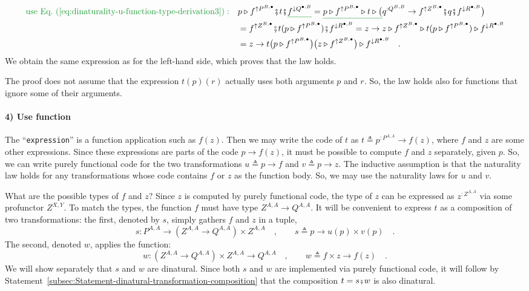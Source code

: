 \begin{align*}
{\color{greenunder}\text{use Eq.~(\ref{eq:dinaturality-u-function-type-derivation3})}:}\quad & p\triangleright f^{\uparrow P^{B,\bullet}}\bef t\bef\gunderline{f^{\downarrow Q^{\bullet,B}}}=\gunderline{p\triangleright f^{\uparrow P^{B,\bullet}}\triangleright t\triangleright\big(}q^{:Q^{B,B}}\rightarrow f^{\uparrow Z^{B,\bullet}}\bef q\bef f^{\downarrow R^{\bullet,B}}\big)\\
 & =f^{\uparrow Z^{B,\bullet}}\bef t(p\triangleright f^{\uparrow P^{B,\bullet}})\bef f^{\downarrow R^{\bullet,B}}=z\rightarrow z\triangleright f^{\uparrow Z^{B,\bullet}}\triangleright t(p\triangleright f^{\uparrow P^{B,\bullet}})\triangleright f^{\downarrow R^{\bullet,B}}\\
 & =z\rightarrow t\big(p\triangleright f^{\uparrow P^{B,\bullet}}\big)\big(z\triangleright f^{\uparrow Z^{B,\bullet}}\big)\triangleright f^{\downarrow R^{\bullet,B}}\quad.
\end{align*}
We obtain the same expression as for the left-hand side, which proves
that the law holds.

The proof does not assume that the expression $t(p)(r)$ actually
uses both arguments $p$ and $r$. So, the law holds also for functions
that ignore some of their arguments.

\paragraph{4) Use function }

The \textsf{``}\lstinline!expression!\textsf{''} is a function application such as
$f(z)$. Then we may write the code of $t$ as $t\triangleq p^{:P^{A,A}}\rightarrow f(z)$,
where $f$ and $z$ are some other expressions. Since these expressions
are parts of the code $p\rightarrow f(z)$, it must be possible to
compute $f$ and $z$ separately, given $p$. So, we can write purely
functional code for the two transformations $u\triangleq p\rightarrow f$
and $v\triangleq p\rightarrow z$. The inductive assumption is that
the naturality law holds for any transformations whose code contains
$f$ or $z$ as the function body. So, we may use the naturality laws
for $u$ and $v$.

What are the possible types of $f$ and $z$? Since $z$ is computed
by purely functional code, the type of $z$ can be expressed as $z^{:Z^{A,A}}$
via some profunctor $Z^{X,Y}$. To match the types, the function $f$
must have type $Z^{A,A}\rightarrow Q^{A,A}$. It will be convenient
to express $t$ as a composition of two transformations: the first,
denoted by $s$, simply gathers $f$ and $z$ in a tuple,
\[
s:P^{A,A}\rightarrow(Z^{A,A}\rightarrow Q^{A,A})\times Z^{A,A}\quad,\quad\quad s\triangleq p\rightarrow u(p)\times v(p)\quad.
\]
The second, denoted $w$, applies the function:
\[
w:(Z^{A,A}\rightarrow Q^{A,A})\times Z^{A,A}\rightarrow Q^{A,A}\quad,\quad\quad w\triangleq f\times z\rightarrow f(z)\quad.
\]
We will show separately that $s$ and $w$ are dinatural. Since both
$s$ and $w$ are implemented via purely functional code, it will
follow by Statement~\ref{subsec:Statement-dinatural-transformation-composition}
that the composition $t=s\bef w$ is also dinatural.

